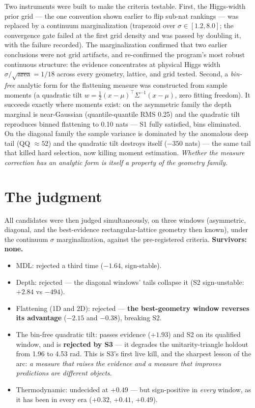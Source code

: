 \documentclass[aps,prd,preprint,nofootinbib]{revtex4-2}
\begin{document}
Two instruments were built to make the criteria testable. First, the
Higgs-width prior grid --- the one convention shown earlier to flip sub-nat
rankings --- was replaced by a continuum marginalization (trapezoid over
$\sigma\in[1.2,8.0]$; the convergence gate failed at the first grid density and
was passed by doubling it, with the failure recorded). The marginalization
confirmed that two earlier conclusions were not grid artifacts, and
re-confirmed the program's most robust continuous structure: the evidence
concentrates at physical Higgs width $\sigma/\sqrt{\mathrm{area}}=1/18$ across
every geometry, lattice, and grid tested. Second, a \emph{bin-free} analytic
form for the flattening measure was constructed from sample moments (a
quadratic tilt $w=\tfrac12(x-\mu)^{\!\top}\Sigma^{-1}(x-\mu)$, zero fitting
freedom). It succeeds exactly where moments exist: on the asymmetric family the
depth marginal is near-Gaussian (quantile-quantile RMS 0.25) and the quadratic
tilt reproduces binned flattening to 0.10 nats --- S1 fully satisfied, bins
eliminated. On the diagonal family the sample variance is dominated by the
anomalous deep tail (QQ $\approx 52$) and the quadratic tilt destroys itself
($-350$ nats) --- the same tail that killed hard selection, now killing moment
estimation. \emph{Whether the measure correction has an analytic form is itself
a property of the geometry family.}

\section{The judgment}

All candidates were then judged simultaneously, on three windows (asymmetric,
diagonal, and the best-evidence rectangular-lattice geometry then known), under
the continuum $\sigma$ marginalization, against the pre-registered criteria.
\textbf{Survivors: none.}
\begin{itemize}
\item MDL: rejected a third time ($-1.64$, sign-stable).
\item Depth: rejected --- the diagonal windows' tails collapse it (S2
      sign-unstable: $+2.84$ vs $-494$).
\item Flattening (1D and 2D): rejected --- \textbf{the best-geometry window
      reverses its advantage} ($-2.15$ and $-0.38$), breaking S2.
\item The bin-free quadratic tilt: passes evidence ($+1.93$) and S2 on its
      qualified window, and is \textbf{rejected by S3} --- it degrades the
      unitarity-triangle holdout from 1.96 to 4.53 rad. This is S3's first live
      kill, and the sharpest lesson of the arc: \emph{a measure that raises the
      evidence and a measure that improves predictions are different objects.}
\item Thermodynamic: undecided at $+0.49$ --- but sign-positive in \emph{every}
      window, as it has been in every era ($+0.32$, $+0.41$, $+0.49$).
\end{itemize}
\end{document}
